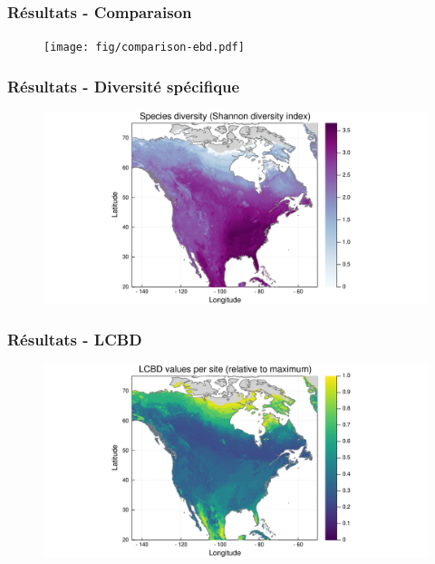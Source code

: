 \documentclass[10pt]{beamer}
\begin{document}
\begin{frame}
  \frametitle{Résultats - Comparaison}
  \begin{figure}
    \centering
    \texttt{[image: fig/comparison-ebd.pdf]}
  \end{figure}
\end{frame}

\begin{frame}
  \frametitle{Résultats - Diversité spécifique}
  \begin{figure}
    \centering
    \includegraphics[scale=0.4]{fig/diversity-ebd.pdf}
  \end{figure}
\end{frame}

\begin{frame}
  \frametitle{Résultats - LCBD}
  \begin{figure}
    \centering
    \includegraphics[scale=0.4]{fig/lcbd-ebd.pdf}
  \end{figure}
\end{frame}
\end{document}
